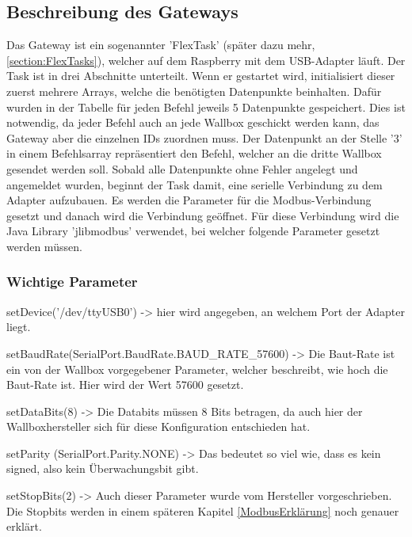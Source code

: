 \subsection{Beschreibung des Gateways} 
Das Gateway ist ein sogenannter 'FlexTask' (später dazu mehr, \ref{section:FlexTasks}), welcher auf dem Raspberry mit dem USB-Adapter läuft. Der Task ist in drei Abschnitte unterteilt. Wenn er gestartet wird, initialisiert dieser zuerst mehrere Arrays, welche die benötigten Datenpunkte beinhalten. Dafür wurden in der Tabelle für jeden Befehl jeweils 5 Datenpunkte gespeichert. Dies ist notwendig, da jeder Befehl auch an jede Wallbox geschickt werden kann, das Gateway aber die einzelnen IDs zuordnen muss. Der Datenpunkt an der Stelle '3' in einem Befehlsarray repräsentiert den Befehl, welcher an die dritte Wallbox gesendet werden soll.
Sobald alle Datenpunkte ohne Fehler angelegt und angemeldet wurden, beginnt der Task damit, eine serielle Verbindung zu dem Adapter aufzubauen. Es werden die Parameter für die Modbus-Verbindung gesetzt und danach wird die Verbindung geöffnet. Für diese Verbindung wird die Java Library 'jlibmodbus' verwendet, bei welcher folgende Parameter gesetzt werden müssen.

\subsubsection*{Wichtige Parameter} 


\begin{compactitem}
  \item setDevice('/dev/ttyUSB0') -> hier wird angegeben, an welchem Port der Adapter liegt.
  \item setBaudRate(SerialPort.BaudRate.BAUD\_RATE\_57600) -> Die Baut-Rate ist ein von der Wallbox vorgegebener Parameter, welcher beschreibt, wie hoch die Baut-Rate ist. Hier wird der Wert 57600 gesetzt.
  \item setDataBits(8) -> Die Databits müssen 8 Bits betragen, da auch hier der Wallboxhersteller sich für diese Konfiguration entschieden hat.
  \item setParity (SerialPort.Parity.NONE) -> Das bedeutet so viel wie, dass es kein signed, also kein Überwachungsbit gibt.
  \item setStopBits(2) -> Auch dieser Parameter wurde vom Hersteller vorgeschrieben. Die Stopbits werden in einem späteren Kapitel \ref{ModbusErklärung} noch genauer erklärt.
\end{compactitem}

